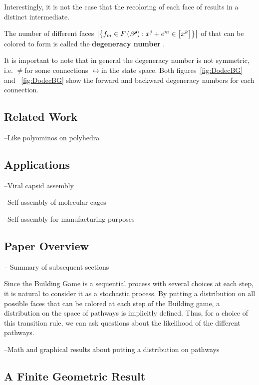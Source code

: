 Interestingly, it is not the case that the recoloring of each face of \xj\spc results in a distinct intermediate. 
\begin{mydef}
The number of different faces $\left|\left\{f_m \in F\left(\mathscr{P}\right) : x^j + e^m \in \left[x^k\right]\right\}\right|$ of \xj\spc that can be colored to form \xk\spc is called the \textbf{degeneracy number} \Sjk.
\end{mydef}
It is important to note that in general the degeneracy number is not symmetric, i.e. \Sjk$\neq$\Skj\spc for some connections \xj\spc$\leftrightarrow$\spc\xk\spc in the state space. Both figures~\ref{fig:DodecBG} and ~\ref{fig:DodecBG} show the forward and backward degeneracy numbers for each connection.

\subsection{Related Work}
--Like polyominos on polyhedra

\subsection{Applications}
--Viral capsid assembly

--Self-assembly of molecular cages

--Self assembly for manufacturing purposes
\subsection{Paper Overview}
-- Summary of subsequent sections

Since the Building Game is a sequential process with several choices at each step, it is natural to consider it as a stochastic process. By putting a distribution on all possible faces that can be colored \spc at each step of the Building game, a distribution on the space of pathways is implicitly defined. Thus, for a choice of this transition rule, we can ask questions about the likelihood of the different pathways. 

--Math and graphical results about putting a distribution on pathways


\subsection{A Finite Geometric Result}

